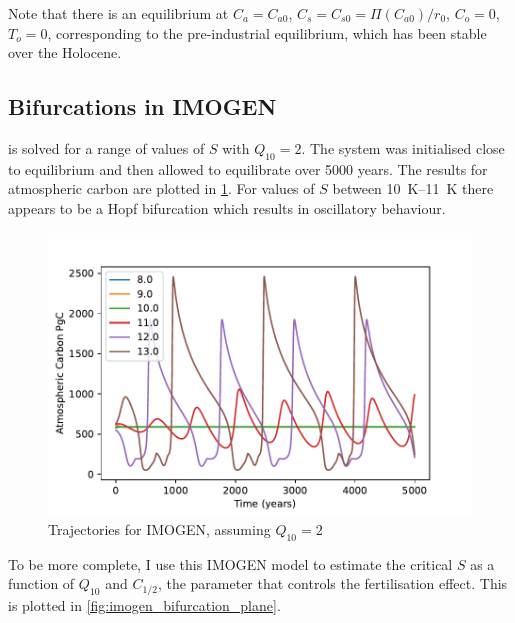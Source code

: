 Note that there is an equilibrium at $C_a = C_{a0}$, $C_s = C_{s0} = \Pi(C_{a0})/r_0$, $C_o = 0$, $T_o = 0$, corresponding to the pre-industrial equilibrium, which has been stable over the
Holocene.

\subsection{Bifurcations in IMOGEN}
 is solved for a range of values of $S$ with $Q_{10} = 2$. The system was initialised close to equilibrium and then allowed to equilibrate over 5000 years.
The results for atmospheric carbon are plotted in \cref{fig:imogen_trajectories}. For values of $S$ between \SIrange{10}{11}{\kelvin} there appears to be a Hopf bifurcation which results
in oscillatory behaviour. 
\begin{figure}
  \centering
  \includegraphics[width=\textwidth,keepaspectratio]{imogen_traj}
  \caption{Trajectories for IMOGEN, assuming $Q_{10} = 2$}
  \label{fig:imogen_trajectories}
\end{figure}

To be more complete, I use this IMOGEN model to estimate the critical $S$ as a function of $Q_{10}$ and $C_{1/2}$, the parameter that controls the  fertilisation effect. This
is plotted in \cref{fig:imogen_bifurcation_plane}.

